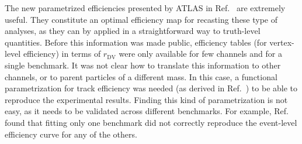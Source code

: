 The new parametrized efficiencies presented by ATLAS in Ref.~\cite{SUSY-2016-08} are extremely useful. They constitute an optimal efficiency map for recasting these type of analyses, as they can by applied in a straightforward way to truth-level quantities. Before this information was made public, efficiency tables (for vertex-level efficiency) in terms of $r_\mathrm{DV}$ were only available for few channels and for a single benchmark. It was not clear how to translate this information to other channels, or to parent particles of a different mass. In this case, a functional parametrization for track efficiency was needed (as derived in Ref.~\cite{Allanach:2016pam}) to be able to reproduce the experimental results. Finding this kind of parametrization is not easy, as it needs to be validated across different benchmarks. For example, Ref.~\cite{Allanach:2016pam} found that fitting only one benchmark did not correctly reproduce the event-level efficiency curve for any of the others.



